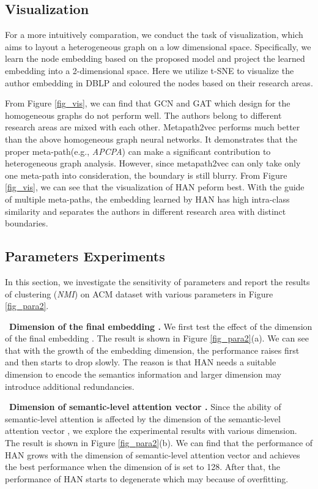 \subsection{Visualization}


For a more intuitively comparation, we conduct the task of visualization,  which aims to layout a heterogeneous graph on a low dimensional space. Specifically, we learn the node embedding based on the proposed model and project the learned embedding into a 2-dimensional space.
Here we utilize t-SNE \cite{maaten2008visualizing} to visualize the author embedding in DBLP and coloured the nodes based on their research areas. 



From Figure \ref{fig_vis}, we can find that GCN and GAT which design for the homogeneous graphs do not perform well. The authors belong to different research areas are mixed with each other.
Metapath2vec performs much better than the above homogeneous graph neural networks.
It demonstrates that the proper meta-path(e.g., \emph{APCPA}) can make a significant contribution to heterogeneous graph analysis.
However, since metapath2vec can only take only one meta-path into consideration, the boundary is still blurry.
From Figure \ref{fig_vis}, we can see that the visualization of  HAN peform best. 
With the guide of multiple meta-paths,  the embedding learned by HAN has high intra-class similarity and separates the authors in different research area with distinct boundaries. 

\subsection{Parameters Experiments}
In this section, we investigate the sensitivity of parameters and report the results of clustering (\emph{NMI}) on ACM dataset with various parameters in Figure \ref{fig_para2}.

\textbullet\  \textbf{Dimension of the final embedding .} We first test the effect of the dimension of the final embedding . 
	The result is shown in Figure \ref{fig_para2}(a).
	We can see that with the growth of the embedding dimension, 
	the performance raises first and then starts to drop slowly. 
	The reason is that HAN needs a suitable dimension to encode the semantics information and 
	larger dimension may introduce additional redundancies. 

\textbullet\   \textbf{Dimension of semantic-level attention vector .} Since the ability of semantic-level attention is affected by the dimension of the semantic-level attention vector , we explore the experimental results 
	with various dimension. The result is shown in Figure \ref{fig_para2}(b).
	We can find that the performance of HAN grows with the dimension of semantic-level attention vector and achieves the best performance when the dimension of  is set to 128.
	After that, the performance of HAN starts to degenerate which may because of overfitting.
	


